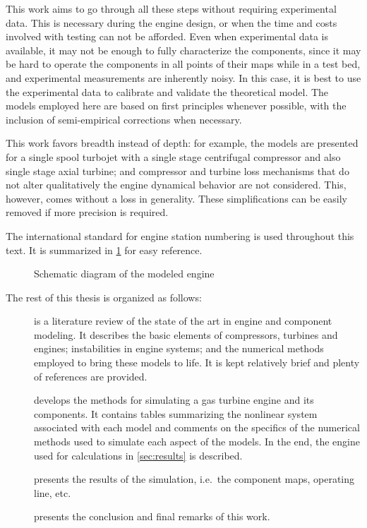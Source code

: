 This work aims to go through all these steps without requiring experimental data.
This is necessary during the engine design, or when the time and costs involved with testing can not be afforded.
Even when experimental data is available, it may not be enough to fully characterize the components,
since it may be hard to operate the components in all points of their maps while in a test bed,
and experimental measurements are inherently noisy. 
In this case, it is best to use the experimental data to calibrate and validate the theoretical model.
The models employed here are based on first principles whenever possible, 
with the inclusion of semi-empirical corrections when necessary. 

This work favors breadth instead of depth: 
for example, the models are presented for a single spool turbojet with a single stage centrifugal compressor and also single stage axial turbine; and compressor and turbine loss mechanisms that do not alter qualitatively the engine dynamical behavior are not considered. 
This, however, comes without a loss in generality. 
These simplifications can be easily removed if more precision is required.

The international standard for engine station numbering \cite{ARP755A} is used throughout this text. 
It is summarized in \cref{fig:engine_schematic} for easy reference.

\begin{figure}[b]
    \caption{Schematic diagram of the modeled engine}
    \label{fig:engine_schematic}
    
    \source{\authorsfigure}
\end{figure}


The rest of this thesis is organized as follows: 
\begin{description}
    \item[] is a literature review of the state of the art in engine and component modeling. 
        It describes the basic elements of compressors, turbines and engines; 
        instabilities in engine systems; and the numerical methods employed to bring these models to life. 
        It is kept relatively brief and plenty of references are provided.
    \item[] develops the methods for simulating a gas turbine engine and its components. 
        It contains tables summarizing the nonlinear system associated with each model 
        and comments on the specifics of the numerical methods used to simulate each aspect of the models. 
        In the end, the engine used for calculations in \cref{sec:results} is described.
    \item[] presents the results of the simulation, i.e.\ the component maps, operating line, etc.
    \item[] presents the conclusion and final remarks of this work.
\end{description}


